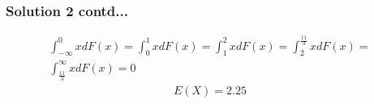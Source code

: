 \documentclass{beamer}
\begin{document}
\begin{frame}[fragile]
\frametitle{Solution 2 contd...}
\begin{flushleft}
\begin{multline}
    \int_{-\infty}^{0}xdF(x) = \int_{0}^{1}xdF(x) = \int_{1}^{2}xdF(x) =  \int_{2}^{\frac{11}{3}}xdF(x) =\\ \int_{\frac{11}{3}}^{\infty}xdF(x) = 0
\end{multline}
\begin{align}
    E(X) = 2.25
\end{align}
\end{flushleft}
\end{frame}
\end{document}
